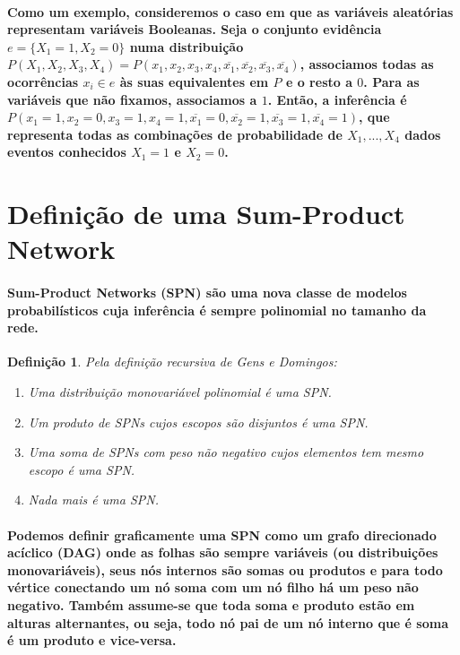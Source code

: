 \documentclass[a4paper,10pt]{article}
\theoremstyle{plain}
\newtheorem*{spn-def}{Definição}
\begin{document}
\paragraph{
  Como um exemplo, consideremos o caso em que as variáveis aleatórias representam variáveis 
Booleanas. Seja o conjunto evidência $e=\{X_1=1,X_2=0\}$ numa distribuição $P(X_1,X_2,X_3,X_4)=
P(x_1,x_2,x_3,x_4,\overline{x_1},\overline{x_2},\overline{x_3},\overline{x_4})$, associamos todas 
as ocorrências $x_i \in e$ às suas equivalentes em $P$ e o resto a $0$. Para as variáveis que não 
fixamos, associamos a $1$. Então, a inferência é $P(x_1=1,x_2=0,x_3=1,x_4=1,\overline{x_1}=0,
\overline{x_2}=1,\overline{x_3}=1,\overline{x_4}=1)$, que representa todas as combinações de 
probabilidade de $X_1,...,X_4$ dados eventos conhecidos $X_1=1$ e $X_2=0$.
}

\section{Definição de uma Sum-Product Network}

\paragraph{
  Sum-Product Networks (SPN) são uma nova classe de modelos probabilísticos cuja inferência é sempre
polinomial no tamanho da rede.
}

\begin{spn-def} Pela definição recursiva de Gens e Domingos\cite{gens-domingos}:
\begin{enumerate} \itemsep0pt
  \item Uma distribuição monovariável polinomial é uma SPN.
  \item Um produto de SPNs cujos escopos são disjuntos é uma SPN.
  \item Uma soma de SPNs com peso não negativo cujos elementos tem mesmo escopo é uma SPN.
  \item Nada mais é uma SPN.
\end{enumerate}
\end{spn-def}

\paragraph{
  Podemos definir graficamente uma SPN como um grafo direcionado acíclico (DAG) onde as 
folhas são sempre variáveis (ou distribuições monovariáveis), seus nós internos são somas ou 
produtos e para todo vértice conectando um nó soma com um nó filho há um peso não negativo. 
Também assume-se que toda soma e produto estão em alturas alternantes, ou seja, todo nó pai 
de um nó interno que é soma é um produto e vice-versa.
}
\end{document}
